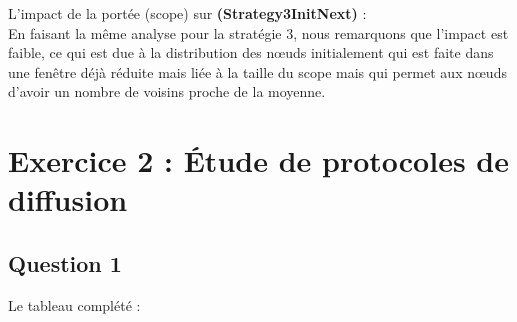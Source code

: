 \documentclass[10pt]{report}
\begin{document}
L'impact de la portée (scope) sur \textbf{(Strategy3InitNext)} :\\
En faisant la même analyse pour la stratégie 3, nous remarquons que l'impact est faible, ce qui est due à la distribution des nœuds initialement qui est faite dans une fenêtre déjà réduite mais liée à la taille du scope mais qui permet aux nœuds d'avoir un nombre de voisins proche de la moyenne. 
\newpage
\section{Exercice 2 : Étude de protocoles de diffusion}
\subsection{Question 1}

Le tableau complété :
\end{document}
